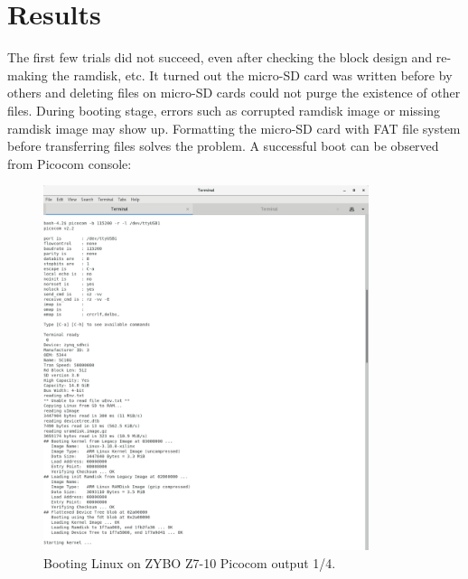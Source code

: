 \documentclass[11pt,letterpaper,titlepage]{article}
\begin{document}
\newpage

\part{Results}

The first few trials did not succeed, even after checking the block design and re-making the ramdisk, etc. It turned out the micro-SD card was written before by others and deleting files on micro-SD cards could not purge the existence of other files. During booting stage, errors such as corrupted ramdisk image or missing ramdisk image may show up. Formatting the micro-SD card with FAT file system before transferring files solves the problem. A successful boot can be observed from Picocom console:

\begin{figure}[ht]
    \centering
    \includegraphics[width=0.85\textwidth]{boot_1.png}
    \caption{Booting Linux on ZYBO Z7-10 Picocom output 1/4.}
\end{figure}

\newpage
\end{document}
